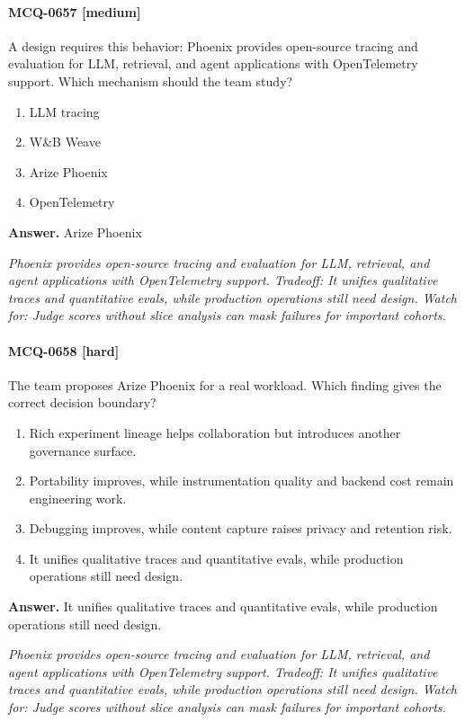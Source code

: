 \paragraph{MCQ-0657 [medium]} A design requires this behavior: Phoenix provides open-source tracing and evaluation for LLM, retrieval, and agent applications with OpenTelemetry support. Which mechanism should the team study?
\begin{enumerate}[label=\Alph*.]
\item LLM tracing
\item W\&B Weave
\item Arize Phoenix
\item OpenTelemetry
\end{enumerate}
\noindent\textbf{Answer.} Arize Phoenix
\par\textit{Phoenix provides open-source tracing and evaluation for LLM, retrieval, and agent applications with OpenTelemetry support. Tradeoff: It unifies qualitative traces and quantitative evals, while production operations still need design. Watch for: Judge scores without slice analysis can mask failures for important cohorts.}
\paragraph{MCQ-0658 [hard]} The team proposes Arize Phoenix for a real workload. Which finding gives the correct decision boundary?
\begin{enumerate}[label=\Alph*.]
\item Rich experiment lineage helps collaboration but introduces another governance surface.
\item Portability improves, while instrumentation quality and backend cost remain engineering work.
\item Debugging improves, while content capture raises privacy and retention risk.
\item It unifies qualitative traces and quantitative evals, while production operations still need design.
\end{enumerate}
\noindent\textbf{Answer.} It unifies qualitative traces and quantitative evals, while production operations still need design.
\par\textit{Phoenix provides open-source tracing and evaluation for LLM, retrieval, and agent applications with OpenTelemetry support. Tradeoff: It unifies qualitative traces and quantitative evals, while production operations still need design. Watch for: Judge scores without slice analysis can mask failures for important cohorts.}
